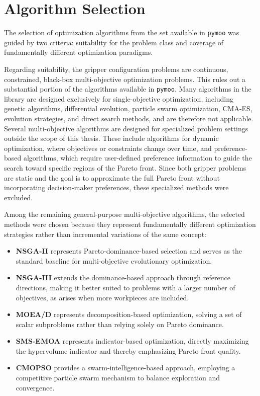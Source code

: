 \section{Algorithm Selection}
\label{sec:methodology_algorithm_selection}

The selection of optimization algorithms from the set available in \texttt{pymoo} was guided by two criteria: suitability for the problem class and
coverage of fundamentally different optimization paradigms.

Regarding suitability, the gripper configuration problems are continuous, constrained, black-box multi-objective optimization problems. This rules out
a substantial portion of the algorithms available in \texttt{pymoo}. Many algorithms in the library are designed exclusively for single-objective
optimization, including genetic algorithms, differential evolution, particle swarm optimization, CMA-ES, evolution strategies, and direct search
methods, and are therefore not applicable. Several multi-objective algorithms are designed for specialized problem settings outside the scope of this
thesis. These include algorithms for dynamic optimization, where objectives or constraints change over time, and preference-based algorithms, which
require user-defined preference information to guide the search toward specific regions of the Pareto front. Since both gripper problems are static
and the goal is to approximate the full Pareto front without incorporating decision-maker preferences, these specialized methods were
excluded\cite{pymoo}.

Among the remaining general-purpose multi-objective algorithms, the selected methods were chosen because they represent fundamentally different
optimization strategies rather than incremental variations of the same concept:

\begin{itemize}
    \item \textbf{NSGA-II} represents Pareto-dominance-based selection and serves as the standard baseline for multi-objective evolutionary
    optimization\cite{nsga2}.

    \item \textbf{NSGA-III} extends the dominance-based approach through reference directions, making it better suited to problems with a larger
    number of objectives, as arises when more workpieces are included\cite{nsga3}.

    \item \textbf{MOEA/D} represents decomposition-based optimization, solving a set of scalar subproblems rather than relying solely on Pareto
    dominance\cite{moead}.

    \item \textbf{SMS-EMOA} represents indicator-based optimization, directly maximizing the hypervolume indicator and thereby emphasizing Pareto
    front quality\cite{smsemoa}.

    \item \textbf{CMOPSO} provides a swarm-intelligence-based approach, employing a competitive particle swarm mechanism to balance exploration and
    convergence\cite{cmopso}.
\end{itemize}

